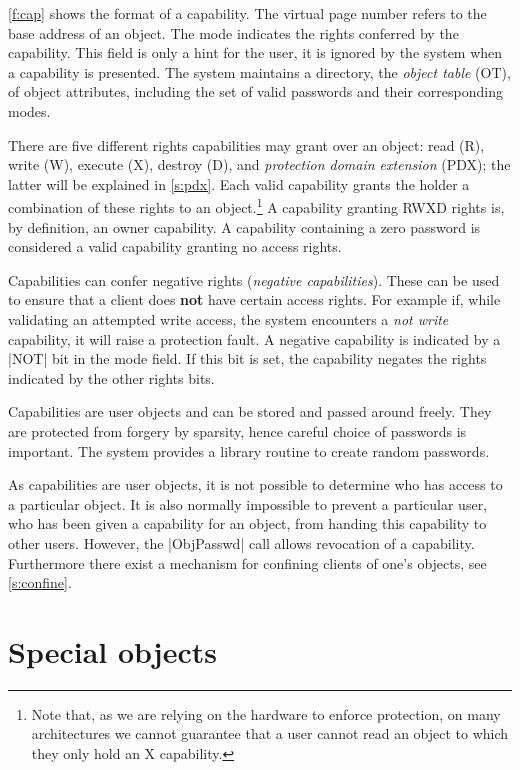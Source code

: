 \documentclass[a4paper,11pt,twoside,dvips]{report}
\begin{document}
\autoref{f:cap} shows the format of a capability. The virtual page
number refers to the base address of an object. The mode indicates the
rights conferred by the capability. This field is only a hint for the
user, it is ignored by the system when a capability is presented. The
system maintains a directory, the \emph{object table} (OT), of object
attributes, including the set of valid passwords and their corresponding
modes.

There are five different rights capabilities may grant over an object:
read (R), write (W), execute (X), destroy (D), and \emph{protection
domain extension} (PDX); the latter will be explained in
\autoref{s:pdx}. Each valid capability grants the holder a combination
of these rights to an object.\footnote{Note that, as we are relying on
the hardware to enforce protection, on many architectures we cannot
guarantee that a user cannot read an object to which they only hold an X
capability.} A capability granting RWXD rights is, by definition, an
owner capability. A capability containing a zero password is considered
a valid capability granting no access rights.

Capabilities can confer negative rights (\emph{negative
capabilities}). These can be used to ensure that a client does
\textbf{not} have certain access rights. For example if, while
validating an attempted write access, the system encounters a \emph{not
write} capability, it will raise a protection fault. A negative
capability is indicated by a |NOT| bit in the mode field. If this bit is
set, the capability negates the rights indicated by the other rights
bits.

Capabilities are user objects and can be stored and passed around
freely. They are protected from forgery by sparsity, hence careful
choice of passwords is important. The system provides a library routine
to create random passwords.

As capabilities are user objects, it is not possible to determine who
has access to a particular object. It is also normally impossible to
prevent a particular user, who has been given a capability for an
object, from handing this capability to other users. However, the
|ObjPasswd| call allows revocation of a capability.
Furthermore there exist a mechanism for confining clients of one's
objects, see \autoref{s:confine}.



\section{\label{s:sp-obj}Special objects}
\end{document}
